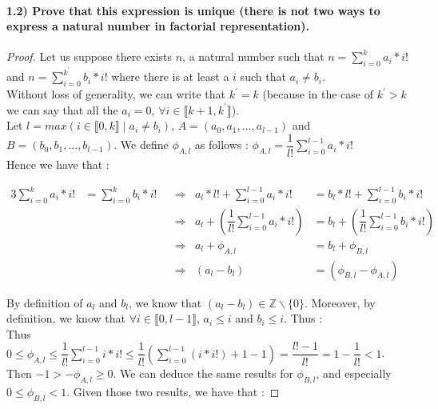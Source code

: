 \documentclass{article}
\begin{document}
\paragraph{1.2) Prove that this expression is unique (there is not two ways to express a natural number in factorial representation).}

\begin{proof}

Let us suppose there exists $n$, a natural number such that $n = \displaystyle\sum_{i=0}^k a_i*i!$ and $n = \displaystyle\sum_{i=0}^{k^\prime} b_i*i!$ where there is at least a $i$ such that $a_i \ne b_i$. \\

Without loss of generality, we can write that $k^\prime = k$ (because in the case of $k^\prime > k$ we can say that all the $a_i=0$, $ \forall i \in \llbracket k+1, k^\prime\rrbracket$). \\

Let $l=max(i \in \llbracket 0, k\rrbracket \mid a_i \ne b_i)$, $A=(a_0, a_1, \dots , a_{l-1})$ and $B=(b_0, b_1, \dots , b_{l-1})$. We define $\phi_{A, l}$ as follows : $\phi_{A, l} = \dfrac{1}{l!}\displaystyle\sum_{i=0}^{l-1} a_i*i!$\\

Hence we have that :

\begin{alignat*}{3}
  \displaystyle\sum_{i=0}^k a_i*i! &= \displaystyle\sum_{i=0}^{k} b_i*i! & &\Rightarrow {} & a_l*l! + \displaystyle\sum_{i=0}^{l-1} a_i*i! &= b_l*l! + \displaystyle\sum_{i=0}^{l-1} b_i*i! \\
  & & &\Rightarrow  & a_l + (\dfrac{1}{l!}\displaystyle\sum_{i=0}^{l-1} a_i*i!) &= b_l + (\dfrac{1}{l!}\displaystyle\sum_{i=0}^{l-1} b_i*i!) \\
  & & &\Rightarrow  & a_l + \phi_{A, l} &= b_l + \phi_{B, l} \\
  & & &\Rightarrow  & (a_l-b_l) &= (\phi_{B, l}-\phi_{A, l})
\end{alignat*}

By definition of $a_l$ and $b_l$, we know that $(a_l-b_l) \in \mathbb{Z}\backslash \{0\}$. Moreover, by definition, we know that $\forall i \in \llbracket 0, l-1\rrbracket$, $a_i \leq i$ and $b_i \leq i$. Thus :\\

Thus $0 \leq \phi_{A, l} \leq \dfrac{1}{l!}\displaystyle\sum_{i=0}^{l-1} i*i! \leq \dfrac{1}{l!}(\displaystyle\sum_{i=0}^{l-1} (i*i!) +1 -1) = \dfrac{l!-1}{l!} = 1-\dfrac{1}{l!} < 1$. Then $-1 > -\phi_{A, l} \geq 0$. We can deduce the same results for $\phi_{B, l}$, and especially $0 \leq \phi_{B, l} < 1$. Given those two results, we have that :


\end{proof}
\end{document}
